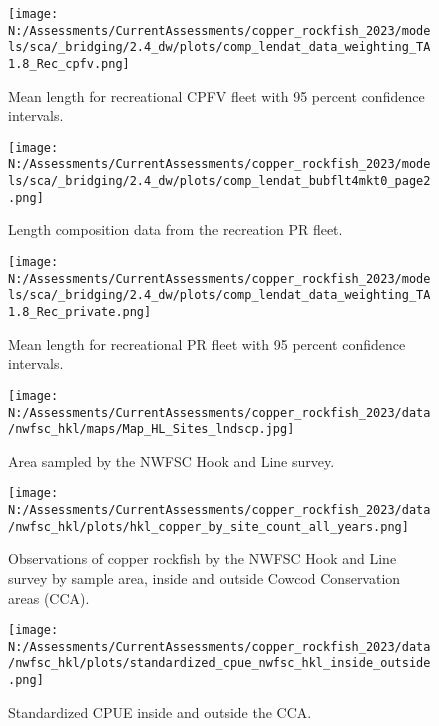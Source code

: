 \documentclass[11pt,
  english,
  letterpaper,
]{article}
\begin{document}
\begin{figure}
\centering
\texttt{[image: N:/Assessments/CurrentAssessments/copper\_rockfish\_2023/models/sca/\_bridging/2.4\_dw/plots/comp\_lendat\_data\_weighting\_TA1.8\_Rec\_cpfv.png]}
\caption{Mean length for recreational CPFV fleet with 95 percent confidence intervals.\label{fig:mean-rec-cpfv-len-data}}
\end{figure}

\begin{figure}
\centering
\texttt{[image: N:/Assessments/CurrentAssessments/copper\_rockfish\_2023/models/sca/\_bridging/2.4\_dw/plots/comp\_lendat\_bubflt4mkt0\_page2.png]}
\caption{Length composition data from the recreation PR fleet.\label{fig:rec-pr-len-data}}
\end{figure}

\begin{figure}
\centering
\texttt{[image: N:/Assessments/CurrentAssessments/copper\_rockfish\_2023/models/sca/\_bridging/2.4\_dw/plots/comp\_lendat\_data\_weighting\_TA1.8\_Rec\_private.png]}
\caption{Mean length for recreational PR fleet with 95 percent confidence intervals.\label{fig:mean-rec-pr-len-data}}
\end{figure}

\begin{figure}
\centering
\texttt{[image: N:/Assessments/CurrentAssessments/copper\_rockfish\_2023/data/nwfsc\_hkl/maps/Map\_HL\_Sites\_lndscp.jpg]}
\caption{Area sampled by the NWFSC Hook and Line survey.\label{fig:nwfsc-hkl-map}}
\end{figure}

\begin{figure}
\centering
\texttt{[image: N:/Assessments/CurrentAssessments/copper\_rockfish\_2023/data/nwfsc\_hkl/plots/hkl\_copper\_by\_site\_count\_all\_years.png]}
\caption{Observations of copper rockfish by the NWFSC Hook and Line survey by sample area, inside and outside Cowcod Conservation areas (CCA).\label{fig:nwfsc-hkl-site}}
\end{figure}

\begin{figure}
\centering
\texttt{[image: N:/Assessments/CurrentAssessments/copper\_rockfish\_2023/data/nwfsc\_hkl/plots/standardized\_cpue\_nwfsc\_hkl\_inside\_outside.png]}
\caption{Standardized CPUE inside and outside the CCA.\label{fig:nwfsc-hkl-cca-main}}
\end{figure}
\end{document}
